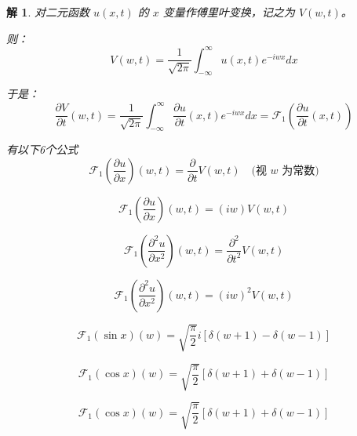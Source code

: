 \documentclass[12pt,a4paper]{article}
\numberwithin{subsection}{section}   %
\numberwithin{subsubsection}{subsection}
\theoremstyle{plain}
\newtheorem{solution}{解}[section]  %
\theoremstyle{definition}
\theoremstyle{remark}
\theoremstyle{remark}
\begin{document}
\begin{solution}
	对二元函数 \(u(x, t)\) 的 \(x\) 变量作傅里叶变换，记之为 \(V(w, t)\)。
	
	则：
	\begin{equation}
		V(w, t) = \frac{1}{\sqrt{2\pi}} \int_{-\infty}^{\infty} u(x, t) e^{-iwx} dx
	\end{equation}
	
	于是：
	\begin{equation}
		\frac{\partial V}{\partial t}(w, t) = \frac{1}{\sqrt{2\pi}} \int_{-\infty}^{\infty} \frac{\partial u}{\partial t}(x, t) e^{-iwx} dx = \mathcal{F}_1\left( \frac{\partial u}{\partial t}(x, t) \right)
	\end{equation}
	
	有以下6个公式
\begin{equation}
	\mathcal{F}_1\left( \frac{\partial u}{\partial x} \right)(w, t) = \frac{\partial}{\partial t} V(w, t) \quad \text{(视 \(w\) 为常数)}
\end{equation}

	
\begin{equation}
	\mathcal{F}_1\left( \frac{\partial u}{\partial x} \right)(w, t) = (iw) V(w, t)
\end{equation}

\begin{equation}
	\mathcal{F}_1\left( \frac{\partial^2 u}{\partial x^2} \right)(w, t) = \frac{\partial^2}{\partial t^2} V(w, t)
\end{equation}

\begin{equation}
	\mathcal{F}_1\left( \frac{\partial^2 u}{\partial x^2} \right)(w, t) = (iw)^2 V(w, t)
\end{equation}


\begin{equation}
	\mathcal{F}_1\left( \sin x \right)(w) = \sqrt{\frac{\pi}{2}} i \left[ \delta(w + 1) - \delta(w - 1) \right]
\end{equation}

\begin{equation}
	\mathcal{F}_1\left( \cos x \right)(w) = \sqrt{\frac{\pi}{2}} \left[ \delta(w + 1) + \delta(w - 1) \right]
\end{equation}
	
\end{solution}

\begin{equation}
	\mathcal{F}_1(\cos x)(w) = \sqrt{\frac{\pi}{2}} \left[ \delta(w + 1) + \delta(w - 1) \right]
\end{equation}
\end{document}
